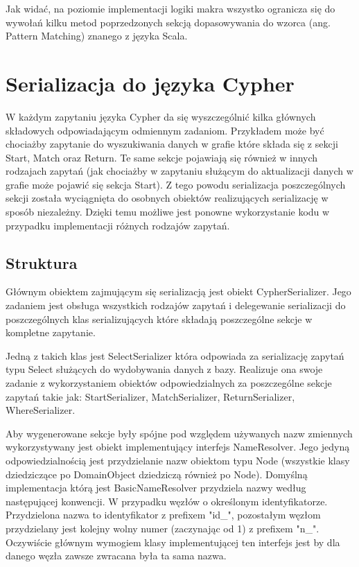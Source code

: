 \documentclass[brudnopis]{xmgr}
\begin{document}


Jak widać, na poziomie implementacji logiki makra wszystko ogranicza się do wywołań kilku metod poprzedzonych sekcją dopasowywania do wzorca (ang. Pattern Matching) znanego z języka Scala.

\section{Serializacja do języka Cypher}

W każdym zapytaniu języka Cypher da się wyszczególnić kilka głównych składowych odpowiadającym odmiennym zadaniom. Przykładem może być chociażby zapytanie do wyszukiwania danych w grafie które składa się z sekcji Start, Match oraz Return. Te same sekcje pojawiają się również w innych rodzajach zapytań (jak chociażby w zapytaniu służącym do aktualizacji danych w grafie może pojawić się sekcja Start). Z tego powodu serializacja poszczególnych sekcji została wyciągnięta do osobnych obiektów realizujących serializację w sposób niezależny. Dzięki temu możliwe jest ponowne wykorzystanie kodu w przypadku implementacji różnych rodzajów zapytań.

\subsection{Struktura}

Głównym obiektem zajmującym się serializacją jest obiekt CypherSerializer. Jego zadaniem jest obsługa wszystkich rodzajów zapytań i delegewanie serializacji do poszczególnych klas serializujących które składają poszczególne sekcje w kompletne zapytanie.

Jedną z takich klas jest SelectSerializer która odpowiada za serializację zapytań typu Select służących do wydobywania danych z bazy. Realizuje ona swoje zadanie z wykorzystaniem obiektów odpowiedzialnych za poszczególne sekcje zapytań takie jak: StartSerializer, MatchSerializer, ReturnSerializer, WhereSerializer.

Aby wygenerowane sekcje były spójne pod względem używanych nazw zmiennych wykorzystywany jest obiekt implementujący interfejs NameResolver. Jego jedyną odpowiedzialnością jest przydzielanie nazw obiektom typu Node (wszystkie klasy dziedziczące po DomainObject dziedziczą również po Node). Domyślną implementacja którą jest BasicNameResolver przydziela nazwy według następującej konwencji. W przypadku węzłów o określonym identyfikatorze. Przydzielona nazwa to identyfikator z prefixem "id\_", pozostałym węzłom przydzielany jest kolejny wolny numer (zaczynając od 1) z prefixem "n\_". Oczywiście głównym wymogiem klasy implementującej ten interfejs jest by dla danego węzła zawsze zwracana była ta sama nazwa.
\end{document}
